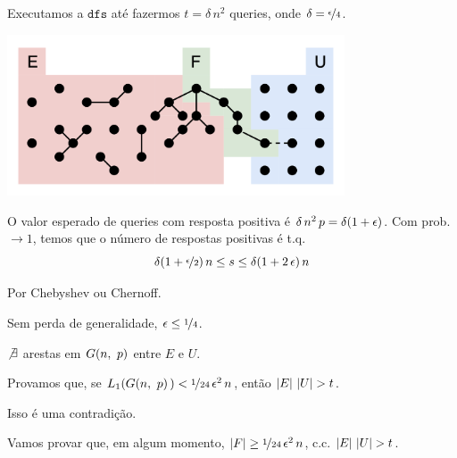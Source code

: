 {Executamos a $\texttt{dfs}$ até fazermos $t=\delta\,n^2$ queries, onde $\delta=\nicefrac{\epsilon}{4}$.

\includegraphics[width=0.75\textwidth]{aulas/10_17/dfs.png}

\begin{observacao}
  O valor esperado de queries com resposta positiva é $\delta\,n^2\,p=\delta\l(1+\epsilon\r)$. Com prob. $\rightarrow1$, temos que o número de respostas positivas é t.q.
  \[
    \delta\l(1+\nf{\epsilon}{2}\r)n \leq s \leq \delta\l(1+2\,\epsilon\r)n
  \]
  
  Por Chebyshev ou Chernoff.
  
  Sem perda de generalidade, $\epsilon\leq\nicefrac{1}{4}$.
\end{observacao}

\begin{fato}
  \normalfont
  $\not\exists$ arestas  em $G\l(n,\ p\r)$ entre $E$ e $U$.
\end{fato}

Provamos que, se $L_1\l(G\l(n,\ p\r)\r)<\nf{1}{24}\,\epsilon^2\,n$, então $\l|E\r|\,\l|U\r|>t$.

Isso é uma contradição.

Vamos provar que, em algum momento, $\l|F\r|\geq\nf{1}{24}\,\epsilon^2\,n$, c.c. $\l|E\r|\,\l|U\r|>t$.

}
